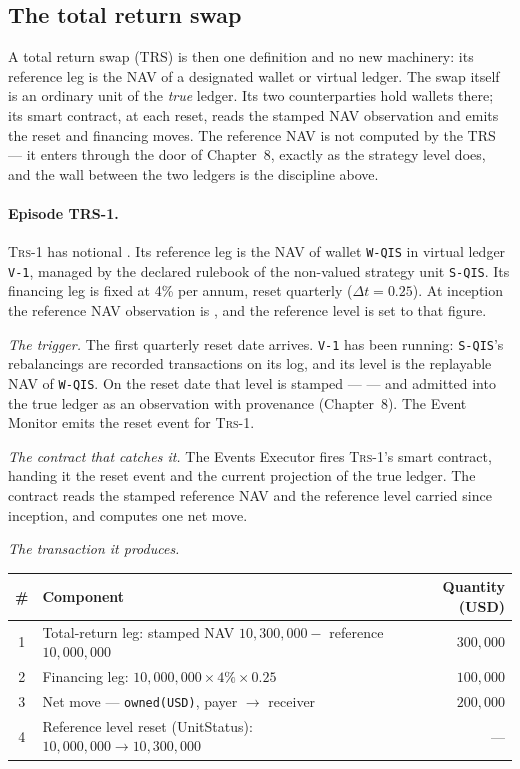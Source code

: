\subsection{The total return swap}

A total return swap (TRS) is then one definition and no new machinery: its
reference leg is the NAV of a designated wallet or virtual ledger. The swap
itself is an ordinary unit of the \emph{true} ledger. Its two counterparties hold
wallets there; its smart contract, at each reset, reads the stamped NAV
observation and emits the reset and financing moves. The reference NAV is not
computed by the TRS --- it enters through the door of Chapter~8, exactly as the
strategy level does, and the wall between the two ledgers is the discipline above.

\paragraph{Episode TRS-1.} \textsc{Trs-1} has notional . Its
reference leg is the NAV of wallet \texttt{W-QIS} in virtual ledger \texttt{V-1},
managed by the declared rulebook of the non-valued strategy unit \texttt{S-QIS}.
Its financing leg is fixed at 4\% per annum, reset quarterly ($\Delta t = 0.25$).
At inception the reference NAV observation is , and the
reference level is set to that figure.

\emph{The trigger.} The first quarterly reset date arrives. \texttt{V-1} has been
running: \texttt{S-QIS}'s rebalancings are recorded transactions on its log, and
its level is the replayable NAV of \texttt{W-QIS}. On the reset date that level is
stamped ---  --- and admitted into the true ledger as an
observation with provenance (Chapter~8). The Event Monitor emits the reset event
for \textsc{Trs-1}.

\emph{The contract that catches it.} The Events Executor fires \textsc{Trs-1}'s
smart contract, handing it the reset event and the current projection of the true
ledger. The contract reads the stamped reference NAV and the reference level
carried since inception, and computes one net move.

\emph{The transaction it produces.}

\begin{center}
\begin{tabular}{clr}
\toprule
\# & Component & Quantity (USD) \\
\midrule
1 & Total-return leg: stamped NAV $10{,}300{,}000 - $ reference $10{,}000{,}000$ & $300{,}000$ \\
2 & Financing leg: $10{,}000{,}000 \times 4\% \times 0.25$                       & $100{,}000$ \\
3 & Net move --- \texttt{owned(USD)}, payer $\rightarrow$ receiver               & $200{,}000$ \\
4 & Reference level reset (UnitStatus): $10{,}000{,}000 \rightarrow 10{,}300{,}000$ & --- \\
\bottomrule
\end{tabular}
\end{center}


